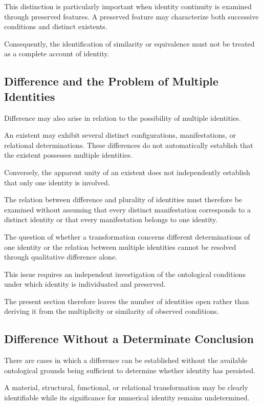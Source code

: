 This distinction is particularly important when
identity continuity is examined through preserved
features. A preserved feature may characterize
both successive conditions and distinct existents.

Consequently, the identification of similarity
or equivalence must not be treated as a complete
account of identity.

\subsection{Difference and the Problem of Multiple Identities}

Difference may also arise in relation to the possibility
of multiple identities.

An existent may exhibit several distinct configurations,
manifestations, or relational determinations. These
differences do not automatically establish that
the existent possesses multiple identities.

Conversely, the apparent unity of an existent does
not independently establish that only one identity
is involved.

The relation between difference and plurality of
identities must therefore be examined without
assuming that every distinct manifestation corresponds
to a distinct identity or that every manifestation
belongs to one identity.

The question of whether a transformation concerns
different determinations of one identity or the
relation between multiple identities cannot be
resolved through qualitative difference alone.

This issue requires an independent investigation
of the ontological conditions under which identity
is individuated and preserved.

The present section therefore leaves the number
of identities open rather than deriving it from
the multiplicity or similarity of observed conditions.

\subsection{Difference Without a Determinate Conclusion}

There are cases in which a difference can be established
without the available ontological grounds being
sufficient to determine whether identity has persisted.

A material, structural, functional, or relational
transformation may be clearly identifiable while
its significance for numerical identity remains
undetermined.

